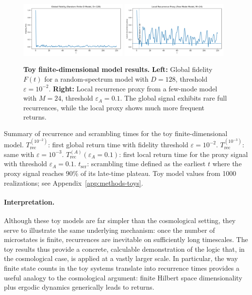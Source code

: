 \documentclass[12pt]{article}
\newcommand{\Trec}{T_{\text{rec}}}
\newcommand{\TrecA}{T^{(A)}_{\text{rec}}}
\newcommand{\tscr}{t_{\text{scr}}}
\theoremstyle{remark}
\begin{document}
\begin{figure}[htbp]
    \centering
    \includegraphics[width=0.48\textwidth]{figs/fig_spin_fidelity.png}
    \includegraphics[width=0.48\textwidth]{figs/fig_spin_localrec.png}
    \caption{
\textbf{Toy finite-dimensional model results.} 
\textbf{Left:} Global fidelity $F(t)$ for a random-spectrum model with $D=128$, threshold $\varepsilon=10^{-2}$. 
\textbf{Right:} Local recurrence proxy from a few-mode model with $M=24$, threshold $\varepsilon_A=0.1$.
The global signal exhibits rare full recurrences, while the local proxy shows much more frequent returns.
    }
    \label{fig:toy_models}
\end{figure}

\begin{table}[htbp]
    \centering
    
    \caption{
Summary of recurrence and scrambling times for the toy finite-dimensional model.  
$\Trec^{(10^{-2})}$: first global return time with fidelity threshold $\varepsilon = 10^{-2}$.  
$\Trec^{(10^{-3})}$: same with $\varepsilon = 10^{-3}$.  
$\TrecA(\varepsilon_A=0.1)$: first local return time for the proxy signal with threshold $\varepsilon_A = 0.1$.  
$\tscr$: scrambling time defined as the earliest $t$ where the proxy signal reaches $90\%$ of its late-time plateau.
Toy model values from 1000 realizations; see Appendix~\ref{app:methods-toys}.
    }
    \label{tab:toy_summary}
\end{table}

\paragraph{Interpretation.} 
Although these toy models are far simpler than the cosmological setting, 
they serve to illustrate the same underlying mechanism: once the number 
of microstates is finite, recurrences are inevitable on sufficiently long 
timescales. The toy results thus provide a concrete, calculable 
demonstration of the logic that, in the cosmological case, is applied at a 
vastly larger scale. In particular, the way finite state counts in the toy 
systems translate into recurrence times provides a useful analogy to the 
cosmological argument: finite Hilbert space dimensionality plus ergodic 
dynamics generically leads to returns.
\end{document}

